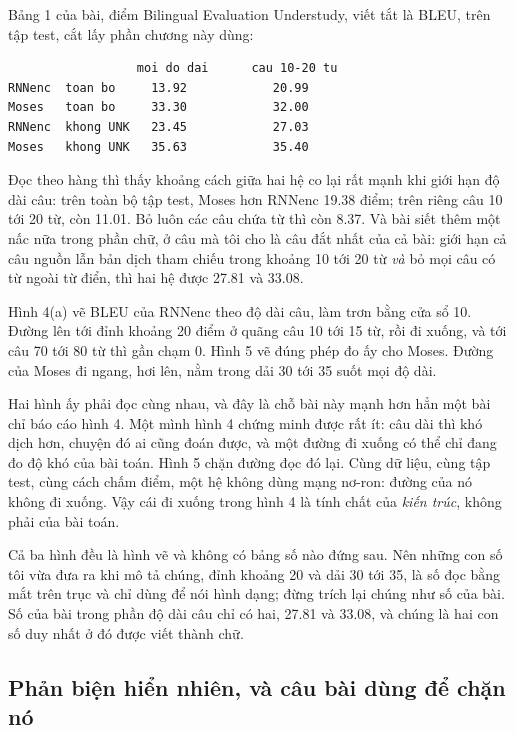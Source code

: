 Bảng 1 của bài, điểm Bilingual Evaluation Understudy, viết tắt là BLEU, trên
tập test, cắt lấy phần chương này dùng:

\begin{verbatim}
                  moi do dai      cau 10-20 tu
RNNenc  toan bo     13.92            20.99
Moses   toan bo     33.30            32.00
RNNenc  khong UNK   23.45            27.03
Moses   khong UNK   35.63            35.40
\end{verbatim}

Đọc theo hàng thì thấy khoảng cách giữa hai hệ co lại rất mạnh khi giới hạn độ
dài câu: trên toàn bộ tập test, Moses hơn RNNenc 19.38 điểm; trên riêng câu 10
tới 20 từ, còn 11.01. Bỏ luôn các câu chứa từ 
thì còn 8.37. Và bài siết thêm một nấc nữa trong phần chữ, ở câu mà tôi cho là
câu đắt nhất của cả bài: giới hạn cả câu nguồn lẫn bản dịch tham chiếu trong
khoảng 10 tới 20 từ \emph{và} bỏ mọi câu có từ ngoài từ điển, thì hai hệ được
27.81 và 33.08.

Hình 4(a) vẽ BLEU của RNNenc theo độ dài câu, làm trơn bằng cửa sổ 10. Đường
lên tới đỉnh khoảng 20 điểm ở quãng câu 10 tới 15 từ, rồi đi xuống, và tới câu
70 tới 80 từ thì gần chạm 0. Hình 5 vẽ đúng phép đo ấy cho Moses. Đường của
Moses đi ngang, hơi lên, nằm trong dải 30 tới 35 suốt mọi độ dài.

%
Hai hình ấy phải đọc cùng nhau, và đây là chỗ bài này mạnh hơn hẳn một bài chỉ
báo cáo hình 4. Một mình hình 4 chứng minh được rất ít: câu dài thì khó dịch
hơn, chuyện đó ai cũng đoán được, và một đường đi xuống có thể chỉ đang đo độ
khó của bài toán. Hình 5 chặn đường đọc đó lại. Cùng dữ liệu, cùng tập test,
cùng cách chấm điểm, một hệ không dùng mạng nơ-ron: đường của nó không đi xuống.
Vậy cái đi xuống trong hình 4 là tính chất của \emph{kiến trúc}, không phải của
bài toán.

Cả ba hình đều là hình vẽ và không có bảng số nào đứng sau. Nên những con số
tôi vừa đưa ra khi mô tả chúng, đỉnh khoảng 20 và dải 30 tới 35, là số đọc bằng
mắt trên trục và chỉ dùng để nói hình dạng; đừng trích lại chúng như số của bài.
Số của bài trong phần độ dài câu chỉ có hai, 27.81 và 33.08, và chúng là hai
con số duy nhất ở đó được viết thành chữ.

\subsection*{Phản biện hiển nhiên, và câu bài dùng để chặn nó}

